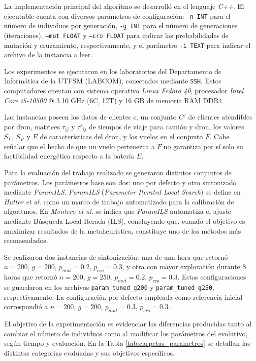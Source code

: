 % 

La implementación principal del algoritmo se desarrolló en el lenguaje \textit{C++}. El ejecutable cuenta con diversos parámetros de configuración: \texttt{-n INT} para el número de individuos por generación, \texttt{-g INT} para el número de generaciones (iteraciones), \texttt{--mut FLOAT} y \texttt{--cro FLOAT} para indicar las probabilidades de mutación y cruzamiento, respectivamente, y el parámetro \texttt{-i TEXT} para indicar el archivo de la instancia a leer.

Los experimentos se ejecutaron en los laboratorios del Departamento de Informática de la UTFSM (LABCOM), conectados mediante \texttt{SSH}. Estos computadores cuentan con sistema operativo \textit{Linux Fedora 40}, procesador \textit{Intel Core i5-10500} @ 3.10 GHz (6C, 12T) y 16 GB de memoria RAM DDR4.

Las instancias poseen los datos de clientes $c$, un conjunto $C'$ de clientes atendibles por dron, matrices $\tau_{ij}$ y $\tau'_{ij}$ de tiempos de viaje para camión y dron, los valores $S_L$, $S_R$ y $E$ de características del dron, y los vuelos en el conjunto $F$. Cabe señalar que el hecho de que un vuelo pertenezca a $F$ no garantiza por sí solo su factibilidad energética respecto a la batería $E$.

Para la evaluación del trabajo realizado se generaron distintos conjuntos de parámetros. Los parámetros base son dos: uno por defecto y otro sintonizado mediante \textit{ParamILS}. \textit{ParamILS} (\textit{Parameter Iterated Local Search}) se define en \textit{Hutter et al.} \cite{hutter2009paramils} como un marco de trabajo automatizado para la calibración de algoritmos. En \textit{Montero et al.} \cite{montero2018tuners} se indica que \textit{ParamILS} automatiza el ajuste mediante Búsqueda Local Iterada (ILS), concluyendo que, cuando el objetivo es maximizar resultados de la metaheurística, constituye uno de los métodos más recomendados.

Se realizaron dos instancias de sintonización: una de una hora que retornó $n=200$, $g=200$, $p_{mut}=0.2$, $p_{cro}=0.3$, y otra con mayor exploración durante 8 horas que retornó $n=200$, $g=250$, $p_{mut}=0.2$, $p_{cro}=0.3$. Estas configuraciones se guardaron en los archivos \texttt{param\_tuned\_g200} y \texttt{param\_tuned\_g250}, respectivamente. La configuración por defecto empleada como referencia inicial correspondió a $n=200$, $g=200$, $p_{mut}=0.3$, $p_{cro}=0.3$.

El objetivo de la experimentación es evidenciar las diferencias producidas tanto al cambiar el número de individuos como al modificar los parámetros del evolutivo, según tiempo y evaluación. En la Tabla \ref{tab:carpetas_parametros} se detallan las distintas categorías evaluadas y sus objetivos específicos.

